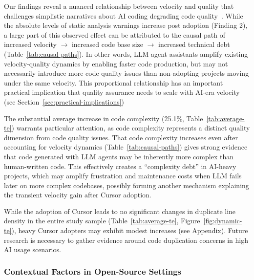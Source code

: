 Our findings reveal a nuanced relationship between velocity and quality that 
challenges simplistic narratives about AI coding degrading code quality~\cite{gitclear-report}. 
While the absolute levels of static analysis warnings increase post adoption (Finding 2), a large part of this observed effect can be attributed to the causal path of increased velocity $\to$ increased code base size $\to$ increased technical debt (Table~\ref{tab:causal-paths}). 
In other words, LLM agent assistants amplify existing velocity-quality dynamics by enabling faster code production, but may not necessarily introduce more code quality issues than non-adopting projects moving under the same velocity.
This proportional relationship has an important practical implication that quality assurance needs to scale with AI-era velocity (see Section~\ref{sec:practical-implications})

The substantial average increase in code complexity (25.1\%, Table~\ref{tab:average-te}) warrants particular attention, as code complexity represents a distinct quality dimension from code quality issues. 
That code complexity increases even after accounting for velocity dynamics (Table~\ref{tab:causal-paths}) gives strong evidence that code generated with LLM agents may be inherently more complex than human-written code.
This effectively creates a ``complexity debt'' in AI-heavy projects, which may amplify frustration and maintenance costs when LLM fails later on more complex codebases, possibly forming another mechanism explaining the transient velocity gain after Cursor adoption.

While the adoption of Cursor leads to no significant changes in duplicate line density in the entire study sample (Table~\ref{tab:average-te}, Figure~\ref{fig:dynamic-te}), heavy Cursor adopters may exhibit modest increases (see Appendix).
Future research is necessary to gather evidence around code duplication concerns in high AI usage scenarios.

\subsubsection{Contextual Factors in Open-Source Settings}

